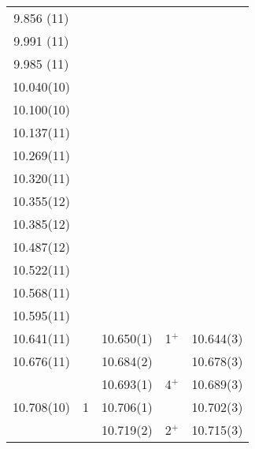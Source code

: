 \begin{center}
\begin{longtable}{cc cc c}
  9.856 (11)           &          &             &                               &               \\
  9.991 (11)           &          &             &                               &               \\
  9.985 (11)           &          &             &                               &               \\
  10.040(10)           &          &             &                               &               \\
  10.100(10)           &          &             &                               &               \\
  10.137(11)           &          &             &                               &               \\
  10.269(11)           &          &             &                               &               \\
  10.320(11)           &          &             &                               &               \\
  10.355(12)           &          &             &                               &               \\
  10.385(12)           &          &             &                               &               \\
  10.487(12)           &          &             &                               &               \\
  10.522(11)           &          &             &                               &               \\
  10.568(11)           &          &             &                               &               \\
  10.595(11)           &          &             &                               &               \\
     10.641(11)        &          & 10.650(1)   &            1$^+$              &    10.644(3)  \\
     10.676(11)        &          & 10.684(2)   &                               &    10.678(3)  \\
                       &          & 10.693(1)   &            4$^+$              &    10.689(3)  \\
     10.708(10)        & 1        & 10.706(1)   &                               &    10.702(3)  \\
                       &          & 10.719(2)   &            2$^+$              &    10.715(3)  \\

\end{longtable}
\end{center}
